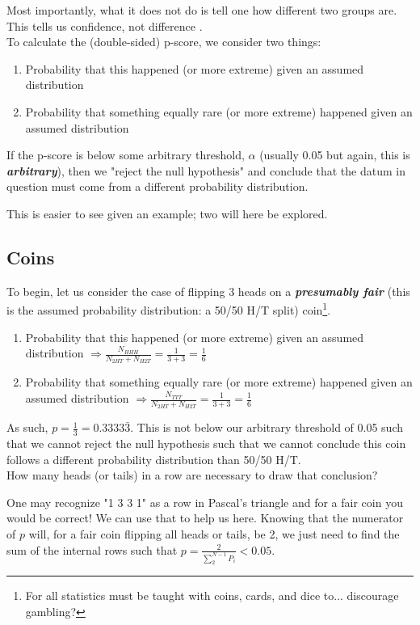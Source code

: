 \documentclass[]{article}
\begin{document}
Most importantly, what it does not do is tell one how different two groups are. This tells us confidence, not difference \cite{statquest_1, statquest_2}.\\

To calculate the (double-sided) p-score, we consider two things:
\begin{enumerate}
	\item Probability that this happened (or more extreme) given an assumed distribution
	\item Probability that something equally rare (or more extreme) happened given an assumed distribution
\end{enumerate}
If the p-score is below some arbitrary threshold, $\alpha$ (usually 0.05 but again, this is \textbf{\textit{arbitrary}}), then we "reject the null hypothesis" and conclude that the datum in question must come from a different probability distribution.

This is easier to see given an example; two will here be explored.

\subsection{Coins}
To begin, let us consider the case of flipping 3 heads on a \textbf{\textit{presumably fair}} (this is the assumed probability distribution: a 50/50 H/T split) coin\footnote{For all statistics must be taught with coins, cards, and dice to... discourage gambling?}.
\begin{enumerate}
	\item Probability that this happened (or more extreme) given an assumed distribution $\Rightarrow \frac{N_{HHH}}{N_{2HT} + N_{H2T}} = \frac{1}{3 + 3} = \frac{1}{6}$ 
	\item Probability that something equally rare (or more extreme) happened given an assumed distribution $\Rightarrow \frac{N_{TTT}}{N_{2HT} + N_{H2T}} = \frac{1}{3 + 3} = \frac{1}{6}$ 
\end{enumerate}
As such, $p = \frac{1}{3} = 0.3333\bar{3}$. This is not below our arbitrary threshold of 0.05 such that we cannot reject the null hypothesis such that we cannot conclude this coin follows a different probability distribution than 50/50 H/T.\\

How many heads (or tails) in a row are necessary to draw that conclusion?

One may recognize "1 3 3 1" as a row in Pascal's triangle and for a fair coin you would be correct! We can use that to help us here.
Knowing that the numerator of $p$ will, for a fair coin flipping all heads or tails, be 2, we just need to find the sum of the internal rows such that $p = \frac{2}{\sum_2^{N - 1} P_i} < 0.05$. 
\end{document}
